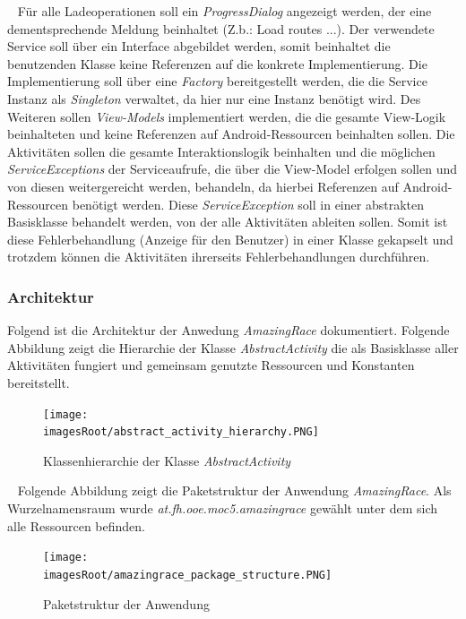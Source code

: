 \documentclass[11pt, a4paper, twoside]{article}   	%
\newcommand{\imagesRoot}{images}
\begin{document}
\ \newline
Für alle Ladeoperationen soll ein \emph{ProgressDialog} angezeigt werden, der eine dementsprechende Meldung beinhaltet (Z.b.: Load routes ...). Der verwendete Service soll über ein Interface abgebildet werden, somit beinhaltet die benutzenden Klasse keine Referenzen auf die konkrete Implementierung. Die Implementierung soll über eine \emph{Factory} bereitgestellt werden, die die Service Instanz als \emph{Singleton} verwaltet, da hier nur eine Instanz benötigt wird. Des Weiteren sollen \emph{View-Models} implementiert werden, die die gesamte View-Logik beinhalteten und keine Referenzen auf Android-Ressourcen beinhalten sollen.
\newline
\newline
Die Aktivitäten sollen die gesamte Interaktionslogik beinhalten und die möglichen \emph{ServiceExceptions} der Serviceaufrufe, die über die View-Model erfolgen sollen und von diesen weitergereicht werden, behandeln, da hierbei Referenzen auf Android-Ressourcen benötigt werden. Diese \emph{ServiceException} soll in einer abstrakten Basisklasse behandelt werden, von der alle Aktivitäten ableiten sollen. Somit ist diese Fehlerbehandlung (Anzeige für den Benutzer) in einer Klasse gekapselt und trotzdem können die Aktivitäten ihrerseits Fehlerbehandlungen durchführen.
\newpage

\subsubsection{Architektur}
Folgend ist die Architektur der Anwedung \emph{AmazingRace} dokumentiert.
\newline
\newline
Folgende Abbildung zeigt die Hierarchie der Klasse \emph{AbstractActivity} die als Basisklasse aller Aktivitäten fungiert und gemeinsam genutzte Ressourcen und Konstanten bereitstellt.
\begin{figure}[h]
	\centering
	\texttt{[image: \\imagesRoot/abstract\_activity\_hierarchy.PNG]}
	\caption
	{Klassenhierarchie der Klasse \emph{AbstractActivity}}
\end{figure}
\ \newline
Folgende Abbildung zeigt die Paketstruktur der Anwendung \emph{AmazingRace}. Als Wurzelnamensraum wurde \emph{at.fh.ooe.moc5.amazingrace} gewählt unter dem sich alle Ressourcen befinden.
\begin{figure}[h]
	\centering
	\texttt{[image: \\imagesRoot/amazingrace\_package\_structure.PNG]}
	\caption
	{Paketstruktur der Anwendung}
\end{figure}
\ \newline
\newpage
\end{document}
